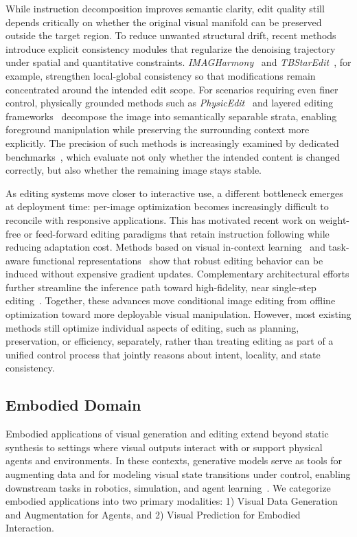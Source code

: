\documentclass{llmxive}
\begin{document}
While instruction decomposition improves semantic clarity, edit quality still depends critically on whether the original visual manifold can be preserved outside the target region. To reduce unwanted structural drift, recent methods introduce explicit consistency modules that regularize the denoising trajectory under spatial and quantitative constraints. \textit{IMAGHarmony}~\citep{Shen2025IMAGHarmonyCI} and \textit{TBStarEdit}~\citep{Fang2025TBStarEditFI}, for example, strengthen local-global consistency so that modifications remain concentrated around the intended edit scope. For scenarios requiring even finer control, physically grounded methods such as \textit{PhysicEdit}~\citep{PhysicEdit} and layered editing frameworks~\citep{Yang2026ControllableLI} decompose the image into semantically separable strata, enabling foreground manipulation while preserving the surrounding context more explicitly. The precision of such methods is increasingly examined by dedicated benchmarks~\citep{Ghazanfari2025SpotEditEV}, which evaluate not only whether the intended content is changed correctly, but also whether the remaining image stays stable.

As editing systems move closer to interactive use, a different bottleneck emerges at deployment time: per-image optimization becomes increasingly difficult to reconcile with responsive applications. This has motivated recent work on weight-free or feed-forward editing paradigms that retain instruction following while reducing adaptation cost. Methods based on visual in-context learning~\citep{Zhang2025InContextEE} and task-aware functional representations~\citep{Mao2025VisualAM, Ma2025X2EditRA} show that robust editing behavior can be induced without expensive gradient updates. Complementary architectural efforts further streamline the inference path toward high-fidelity, near single-step editing~\citep{Liu2025Step1XEditAP, Yao2025ImplementationFF}. Together, these advances move conditional image editing from offline optimization toward more deployable visual manipulation. However, most existing methods still optimize individual aspects of editing, such as planning, preservation, or efficiency, separately, rather than treating editing as part of a unified control process that jointly reasons about intent, locality, and state consistency.


\subsection{Embodied Domain}
Embodied applications of visual generation and editing extend beyond static synthesis to settings where visual outputs interact with or support physical agents and environments. In these contexts, generative models serve as tools for augmenting data and for modeling visual state transitions under control, enabling downstream tasks in robotics, simulation, and agent learning~\citep{meietal2026videoroboticsurvey,li2025uva,zhu2025uwm}. 
We categorize embodied applications into two primary modalities: 1) Visual Data Generation and Augmentation for Agents, and 2) Visual Prediction for Embodied Interaction.
\end{document}
